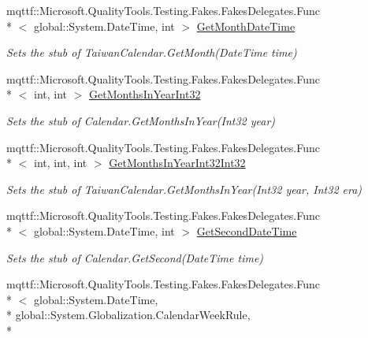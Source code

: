 \begin{DoxyCompactItemize}
mqttf\-::\-Microsoft.\-Quality\-Tools.\-Testing.\-Fakes.\-Fakes\-Delegates.\-Func\\*
$<$ global\-::\-System.\-Date\-Time, int $>$ \hyperlink{class_system_1_1_globalization_1_1_fakes_1_1_stub_taiwan_calendar_a2a4e7d067dc9aacf9420fc41d0b61fee}{Get\-Month\-Date\-Time}
\begin{DoxyCompactList}\small\item\em Sets the stub of Taiwan\-Calendar.\-Get\-Month(\-Date\-Time time)\end{DoxyCompactList}\item 
mqttf\-::\-Microsoft.\-Quality\-Tools.\-Testing.\-Fakes.\-Fakes\-Delegates.\-Func\\*
$<$ int, int $>$ \hyperlink{class_system_1_1_globalization_1_1_fakes_1_1_stub_taiwan_calendar_a9468cfc7f332e5103d536adaab33858d}{Get\-Months\-In\-Year\-Int32}
\begin{DoxyCompactList}\small\item\em Sets the stub of Calendar.\-Get\-Months\-In\-Year(\-Int32 year)\end{DoxyCompactList}\item 
mqttf\-::\-Microsoft.\-Quality\-Tools.\-Testing.\-Fakes.\-Fakes\-Delegates.\-Func\\*
$<$ int, int, int $>$ \hyperlink{class_system_1_1_globalization_1_1_fakes_1_1_stub_taiwan_calendar_a2d66cec81d818cf77af03874db873d94}{Get\-Months\-In\-Year\-Int32\-Int32}
\begin{DoxyCompactList}\small\item\em Sets the stub of Taiwan\-Calendar.\-Get\-Months\-In\-Year(\-Int32 year, Int32 era)\end{DoxyCompactList}\item 
mqttf\-::\-Microsoft.\-Quality\-Tools.\-Testing.\-Fakes.\-Fakes\-Delegates.\-Func\\*
$<$ global\-::\-System.\-Date\-Time, int $>$ \hyperlink{class_system_1_1_globalization_1_1_fakes_1_1_stub_taiwan_calendar_a4106b3c8e29338e91e6310b8e2604203}{Get\-Second\-Date\-Time}
\begin{DoxyCompactList}\small\item\em Sets the stub of Calendar.\-Get\-Second(\-Date\-Time time)\end{DoxyCompactList}\item 
mqttf\-::\-Microsoft.\-Quality\-Tools.\-Testing.\-Fakes.\-Fakes\-Delegates.\-Func\\*
$<$ global\-::\-System.\-Date\-Time, \\*
global\-::\-System.\-Globalization.\-Calendar\-Week\-Rule, \\*

\end{DoxyCompactItemize}
